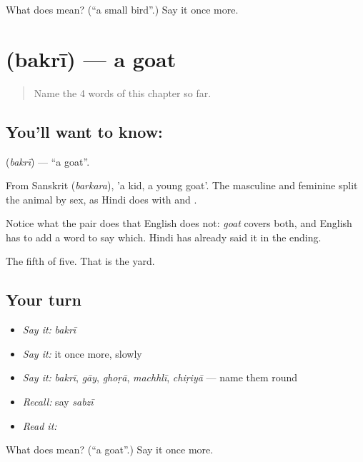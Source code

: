 \begin{tcolorbox}[breakable,colback=teal!4,colframe=teal!35!black,title={Before you move on}]
What does  mean? (\textquotedblleft{}a small bird\textquotedblright{}.) Say it once more.
\end{tcolorbox}
\section[\texorpdfstring{\hi{बकरी} (bakrī)}{बकरी (bakrī)}]{ (bakrī) — a goat}

\label{lesson:HI-C54-goat}



\begin{quote}
Name the 4 words of this chapter so far.
\end{quote}

\subsection*{You'll want to know: }
\textbf{} (\emph{bakrī}) — \textquotedblleft{}a goat\textquotedblright{}.

From Sanskrit  (\emph{barkara}), 'a kid, a young goat'. The masculine  and feminine  split the animal by sex, as Hindi does with  and .

Notice what the pair does that English does not: \emph{goat} covers both, and English has to add a word to say which. Hindi has already said it in the ending.

\begin{grammarlens}[title={What you've built}]
The fifth of five. That is the yard.
\end{grammarlens}

\subsection*{Your turn}
\begin{itemize}
\raggedright
  \item \emph{Say it:} \emph{bakrī}
  \item \emph{Say it:} it once more, slowly
  \item \emph{Say it:} \emph{bakrī}, \emph{gāy}, \emph{ghoṛā}, \emph{machhlī}, \emph{chiṛiyā} — name them round
  \item \emph{Recall:} say \emph{sabzī}
  \item \emph{Read it:} \textbf{}
\end{itemize}

\begin{tcolorbox}[breakable,colback=teal!4,colframe=teal!35!black,title={Before you move on}]
What does  mean? (\textquotedblleft{}a goat\textquotedblright{}.) Say it once more.
\end{tcolorbox}
